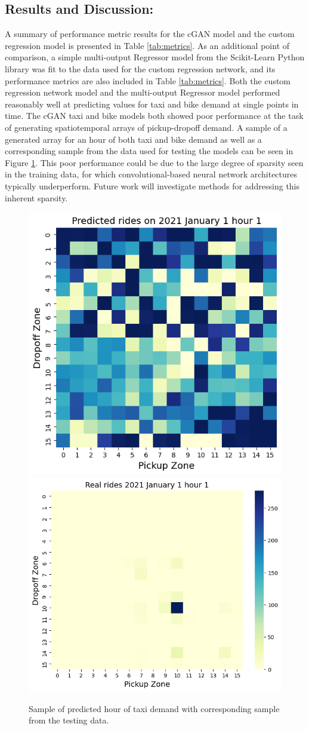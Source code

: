 \documentclass[conference]{IEEEtran}
\begin{document}
\subsection{Results and Discussion:}
A summary of performance metric results for the cGAN model and the custom regression model is presented in Table \ref{tab:metrics}. As an additional 
point of comparison, a simple multi-output Regressor model from the Scikit-Learn Python library \cite{scikit-learn} was fit to 
the data used for the custom regression network, and its performance metrics are also included in Table \ref{tab:metrics}. 
Both the custom regression
 network model and the multi-output Regressor model performed reasonably well at predicting values for taxi and bike demand at 
 single points in time. The cGAN taxi and bike models both showed poor performance at the task of generating spatiotemporal 
 arrays of pickup-dropoff demand. A sample of a generated array for an hour of both taxi and bike demand as well as a 
 corresponding sample from the data used for testing the models can be seen in Figure \ref{fig:ganresults}. 
 This poor performance could be due to 
 the large degree of sparsity seen in the training data, for which convolutional-based neural network architectures typically 
 underperform. Future work will investigate methods for addressing this inherent sparsity. 

 \begin{figure}[t]
  \includegraphics[width=.45\columnwidth]
    {figs/ganpredicted.png}\hfill
  \includegraphics[width=.55\columnwidth]
    {figs/gantest.png}

  \caption{Sample of predicted hour of taxi demand with corresponding sample from the testing data.}
  \label{fig:ganresults}
\end{figure}
\end{document}
